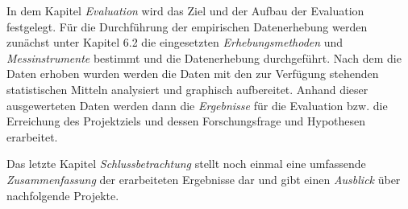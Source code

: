 In dem Kapitel \textit{Evaluation} wird das Ziel und der Aufbau der Evaluation festgelegt. Für die Durchführung der empirischen Datenerhebung werden zunächst unter Kapitel 6.2 die eingesetzten \textit{Erhebungsmethoden} und \textit{Messinstrumente} bestimmt und die Datenerhebung durchgeführt. Nach dem die Daten erhoben wurden werden die Daten mit den zur Verfügung stehenden statistischen Mitteln analysiert und graphisch aufbereitet. Anhand dieser ausgewerteten Daten werden dann die \textit{Ergebnisse} für die Evaluation bzw. die Erreichung des Projektziels und dessen Forschungsfrage und Hypothesen erarbeitet.

Das letzte Kapitel \textit{Schlussbetrachtung} stellt noch einmal eine umfassende \textit{Zusammenfassung} der erarbeiteten Ergebnisse dar und gibt einen \textit{Ausblick} über nachfolgende Projekte.



